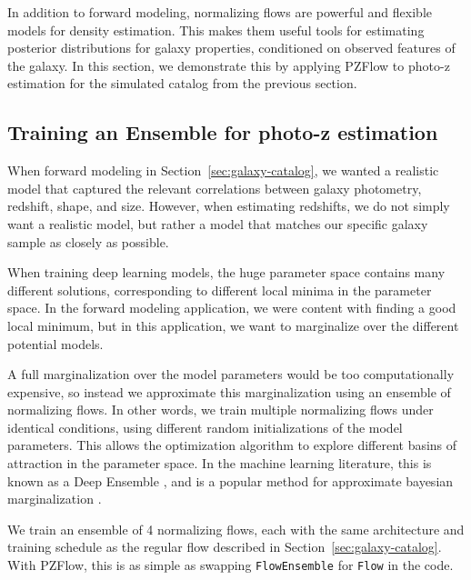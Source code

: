 \documentclass[twocolumn,twocolappendix]{aastex631}
\begin{document}
In addition to forward modeling, normalizing flows are powerful and flexible models for density estimation.
This makes them useful tools for estimating posterior distributions for galaxy properties, conditioned on observed features of the galaxy.
In this section, we demonstrate this by applying PZFlow to photo-z estimation for the simulated catalog from the previous section.

\subsection{Training an Ensemble for photo-z estimation}

When forward modeling in Section~\ref{sec:galaxy-catalog}, we wanted a realistic model that captured the relevant correlations between galaxy photometry, redshift, shape, and size.
However, when estimating redshifts, we do not simply want a realistic model, but rather a model that matches our specific galaxy sample as closely as possible.

When training deep learning models, the huge parameter space contains many different solutions, corresponding to different local minima in the parameter space.
In the forward modeling application, we were content with finding a good local minimum, but in this application, we want to marginalize over the different potential models.

A full marginalization over the model parameters would be too computationally expensive, so instead we approximate this marginalization using an ensemble of normalizing flows.
In other words, we train multiple normalizing flows under identical conditions, using different random initializations of the model parameters.
This allows the optimization algorithm to explore different basins of attraction in the parameter space.
In the machine learning literature, this is known as a Deep Ensemble \citep{lakshminarayanan2017}, and is a popular method for approximate bayesian marginalization \citep{wilson2020,fort2020}.

We train an ensemble of 4 normalizing flows, each with the same architecture and training schedule as the regular flow described in Section~\ref{sec:galaxy-catalog}.
With PZFlow, this is as simple as swapping \texttt{FlowEnsemble} for \texttt{Flow} in the code.
\end{document}
